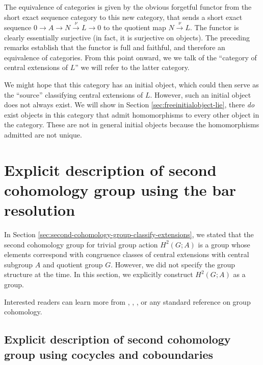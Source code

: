 The equivalence of categories is given by the obvious forgetful
functor from the short exact sequence category to this new category,
that sends a short exact sequence $0 \to A \to N \stackrel{\nu}{\to} L
\to 0$ to the quotient map $N \stackrel{\nu}{\to} L$. The functor is
clearly essentially surjective (in fact, it is surjective on
objects). The preceding remarks establish that the functor is full and
faithful, and therefore an equivalence of categories. From this point
onward, we we talk of the ``category of central extensions of $L$'' we
will refer to the latter category.

We might hope that this category has an initial object, which could
then serve as the ``source'' classifying central extensions of
$L$. However, such an initial object does not always exist. We will
show in Section \ref{sec:freeinitialobject-lie}, there {\em do} exist
objects in this category that admit homomorphisms to every other
object in the category. These are not in general initial objects
because the homomorphisms admitted are not unique.


\section{Explicit description of second cohomology group using the bar resolution}\label{sec:cohomology-explicit}

In Section \ref{sec:second-cohomology-group-classify-extensions}, we
stated that the second cohomology group for trivial group action
$H^2(G;A)$ is a group whose elements correspond with congruence
classes of central extensions with central subgroup $A$ and quotient
group $G$. However, we did not specify the group structure at the
time. In this section, we explicitly construct $H^2(G;A)$ as a group.

Interested readers can learn more from \cite{Baer38},
\cite{Karpilovsky}, \cite{DummitFoote}, or any standard reference on
group cohomology.



\subsection{Explicit description of second cohomology group using cocycles and coboundaries}


